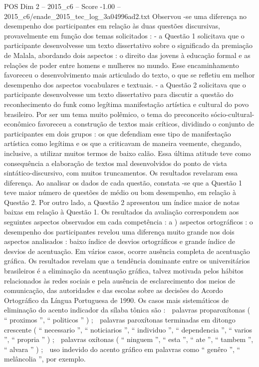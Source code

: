 \begin{textsample}{POS Dim 2 – 2015\_c6 – Score -1.00 – 2015\_c6/enade\_2015\_tec\_log\_3a04996ad2.txt}
Observou -se uma diferença no desempenho dos participantes em relação às duas questões discursivas, provavelmente em função dos temas solicitados : - a Questão 1 solicitava que o participante desenvolvesse um texto dissertativo sobre o significado da premiação de Malala, abordando dois aspectos : o direito das jovens à educação formal e as relações de poder entre homens e mulheres no mundo.
Esse encaminhamento favoreceu o desenvolvimento mais articulado do texto, o que se refletiu em melhor desempenho dos aspectos vocabulares e textuais. - a Questão 2 solicitava que o participante desenvolvesse um texto dissertativo para discutir a questão do reconhecimento do funk como legítima manifestação artística e cultural do povo brasileiro.
Por ser um tema muito polêmico, o tema do preconceito sócio-cultural-econômico favoreceu a construção de textos mais críticos, dividindo o conjunto de participantes em dois grupos : os que defendiam esse tipo de manifestação artística como legítima e os que a criticavam de maneira veemente, chegando, inclusive, a utilizar muitos termos de baixo calão.
Essa última atitude teve como consequência a elaboração de textos mal desenvolvidos do ponto de vista sintático-discursivo, com muitos truncamentos.
Os resultados revelaram essa diferença.
Ao analisar os dados de cada questão, constata -se que a Questão 1 teve maior número de questões de médio ou bom desempenho, em relação à Questão 2.
Por outro lado, a Questão 2 apresentou um índice maior de notas baixas em relação à Questão 1.
Os resultados da avaliação correspondem aos seguintes aspectos observados em cada competência : a ) aspectos ortográficos : o desempenho dos participantes revelou uma diferença muito grande nos dois aspectos analisados : baixo índice de desvios ortográficos e grande índice de desvios de acentuação.
Em vários casos, ocorre ausência completa de acentuação gráfica.
Os resultados revelam que a tendência dominante entre os universitários brasileiros é a eliminação da acentuação gráfica, talvez motivada pelos hábitos relacionados às redes sociais e pela ausência de esclarecimento dos meios de comunicação, das autoridades e das escolas sobre as decisões do Acordo Ortográfico da Língua Portuguesa de 1990.
Os casos mais sistemáticos de eliminação do acento indicador da sílaba tônica são :  palavras proparoxítonas ( “ proximos ”, “ politicos ” ) ;  palavras paroxítonas terminadas em ditongo crescente ( “ necessario ”, “ noticiarios ”, “ individuo ”, “ dependencia ”, “ varios ”, “ propria ” ) ;  palavras oxítonas ( “ ninguem ”, “ esta ”, “ ate ”, “ tambem ”, “ alvara ” ) ;  uso indevido do acento gráfico em palavras como “ genêro ”, “ melâncolia ”, por exemplo.

\end{textsample}
